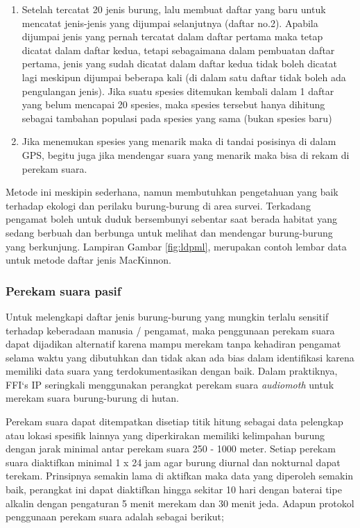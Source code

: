 \documentclass[
]{book}
\begin{document}
\begin{enumerate}
\def\labelenumi{\arabic{enumi}.}
\setcounter{enumi}{1}
\item
  Setelah tercatat 20 jenis burung, lalu membuat daftar yang baru untuk mencatat jenis-jenis yang dijumpai selanjutnya (daftar no.2). Apabila dijumpai jenis yang pernah tercatat dalam daftar pertama maka tetap dicatat dalam daftar kedua, tetapi sebagaimana dalam pembuatan daftar pertama, jenis yang sudah dicatat dalam daftar kedua tidak boleh dicatat lagi meskipun dijumpai beberapa kali (di dalam satu daftar tidak boleh ada pengulangan jenis). Jika suatu spesies ditemukan kembali dalam 1 daftar yang belum mencapai 20 spesies, maka spesies tersebut hanya dihitung sebagai tambahan populasi pada spesies yang sama (bukan spesies baru)
\item
  Jika menemukan spesies yang menarik maka di tandai posisinya di dalam GPS, begitu juga jika mendengar suara yang menarik maka bisa di rekam di perekam suara.
\end{enumerate}

Metode ini meskipin sederhana, namun membutuhkan pengetahuan yang baik terhadap ekologi dan perilaku burung-burung di area survei. Terkadang pengamat boleh untuk duduk bersembunyi sebentar saat berada habitat yang sedang berbuah dan berbunga untuk melihat dan mendengar burung-burung yang berkunjung. Lampiran Gambar \ref{fig:ldpml}, merupakan contoh lembar data untuk metode daftar jenis MacKinnon.

\hypertarget{perekam-suara-pasif}{%
\subsubsection*{Perekam suara pasif}\label{perekam-suara-pasif}}

Untuk melengkapi daftar jenis burung-burung yang mungkin terlalu sensitif terhadap keberadaan manusia / pengamat, maka penggunaan perekam suara dapat dijadikan alternatif karena mampu merekam tanpa kehadiran pengamat selama waktu yang dibutuhkan dan tidak akan ada bias dalam identifikasi karena memiliki data suara yang terdokumentasikan dengan baik. Dalam praktiknya, FFI`s IP seringkali menggunakan perangkat perekam suara \emph{audiomoth} untuk merekam suara burung-burung di hutan.

Perekam suara dapat ditempatkan disetiap titik hitung sebagai data pelengkap atau lokasi spesifik lainnya yang diperkirakan memiliki kelimpahan burung dengan jarak minimal antar perekam suara 250 - 1000 meter. Setiap perekam suara diaktifkan minimal 1 x 24 jam agar burung diurnal dan nokturnal dapat terekam. Prinsipnya semakin lama di aktifkan maka data yang diperoleh semakin baik, perangkat ini dapat diaktifkan hingga sekitar 10 hari dengan baterai tipe alkalin dengan pengaturan 5 menit merekam dan 30 menit jeda. Adapun protokol penggunaan perekam suara adalah sebagai berikut;
\end{document}
